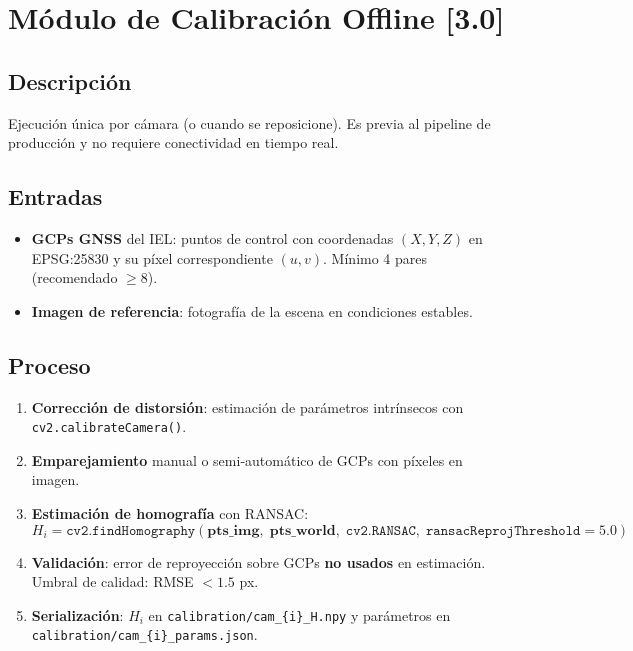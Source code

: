 \chapter{Módulo de Calibración Offline [3.0]}
\label{chap:calibration}

\section{Descripción}

Ejecución única por cámara (o cuando se reposicione). Es previa al pipeline
de producción y no requiere conectividad en tiempo real.

\section{Entradas}

\begin{itemize}
  \item \textbf{GCPs GNSS} del IEL: puntos de control con coordenadas
        $(X, Y, Z)$ en EPSG:25830 y su píxel correspondiente $(u, v)$.
        Mínimo 4 pares (recomendado $\geq 8$).
  \item \textbf{Imagen de referencia}: fotografía de la escena en
        condiciones estables.
\end{itemize}

\section{Proceso}

\begin{enumerate}
  \item \textbf{Corrección de distorsión}: estimación de parámetros
        intrínsecos con \texttt{cv2.calibrateCamera()}.
  \item \textbf{Emparejamiento} manual o semi-automático de GCPs con
        píxeles en imagen.
  \item \textbf{Estimación de homografía} con RANSAC:
        \[
          H_i = \texttt{cv2.findHomography}(
                \mathbf{pts\_img},\;\mathbf{pts\_world},\;
                \texttt{cv2.RANSAC},\;
                \texttt{ransacReprojThreshold}=5.0
                )
        \]
  \item \textbf{Validación}: error de reproyección sobre GCPs \textbf{no
        usados} en estimación. Umbral de calidad: RMSE $< 1.5$ px.
  \item \textbf{Serialización}: $H_i$ en \texttt{calibration/cam\_\{i\}\_H.npy}
        y parámetros en \texttt{calibration/cam\_\{i\}\_params.json}.
\end{enumerate}


